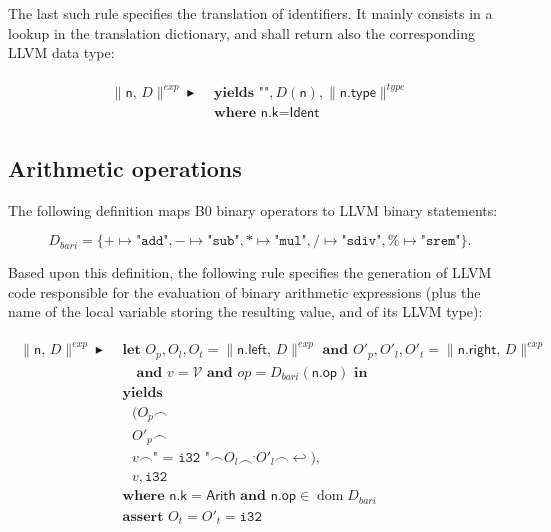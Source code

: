 \documentclass{article}
\newcommand{\trad}[2]{\ensuremath{\lVert \textsf{#1} \rVert^{\textit{#2}}}}
\newcommand{\nl}[0]{\ensuremath{\hookleftarrow}}
\DeclareMathOperator{\conc}{\smallfrown}
\DeclareMathOperator{\isdef}{\blacktriangleright}
\DeclareMathOperator{\dom}{\mbox{dom}}
\begin{document}
The last such rule specifies the translation of identifiers. It mainly
consists in a lookup in the translation dictionary, and shall return
also the corresponding LLVM data type:

\begin{framed}
\begin{align}
\begin{split}
  \trad{n, $D$}{exp} \isdef & \textbf{ yields } \texttt{""}, D(\textsf{n}), \trad{n.type}{type} \\
  & \textbf{ where } \textsf{n.k} = \textsf{Ident}
\end{split}
\end{align}
\end{framed}

\subsection{Arithmetic operations}
\label{sec:arith}

The following definition maps B0 binary operators to LLVM binary statements:

$$D_{bari} = \{ + \mapsto \texttt{"add"}, 
- \mapsto \texttt{"sub"}, * \mapsto \texttt{"mul"}, / \mapsto
\texttt{"sdiv"}, \% \mapsto \texttt{"srem"} \}.$$

Based upon this definition, the following rule specifies the
generation of LLVM code responsible for the evaluation of binary
arithmetic expressions (plus the name of the local variable storing
the resulting value, and of its LLVM type):
\begin{framed}
\begin{align}
\begin{split}
  \trad{n, $D$}{exp} \isdef & \textbf{ let } O_p, O_l, O_t =
  \trad{n.left, $D$}{exp} \textbf{ and }
  O'_p, O'_l, O'_t = \trad{n.right, $D$}{exp} \\
  & \quad \textbf{ and } v = \mathcal{V} \textbf{ and } op = D_{bari}(\textsf{n.op}) \textbf{ in } \\
  & \textbf{ yields} \\
  & \quad (O_p \conc \\
  & \quad O'_p \conc \\
  & \quad v \conc \texttt{" = i32 "} \conc O_l \conc^, O'_l \conc \nl), \\
  & \quad v, \texttt{i32} \\
  & \textbf{ where } \textsf{n.k} = \textsf{Arith} \textbf{ and } \textsf{n.op} \in \dom D_{bari} \\
  & \textbf{ assert } O_t = O'_t = \texttt{i32}
\end{split}
\end{align}
\end{framed}
\end{document}

